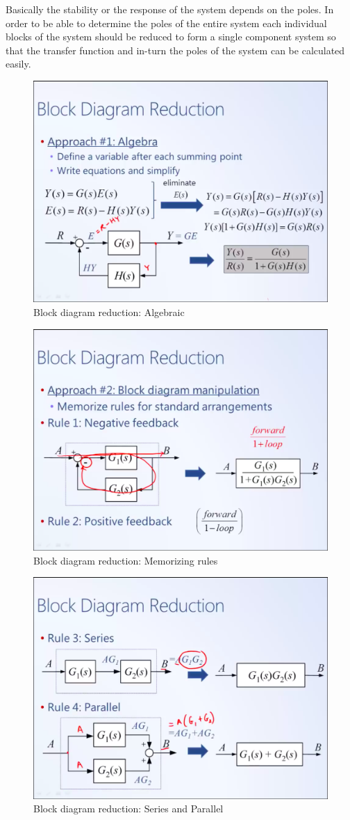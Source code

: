 Basically the stability or the response of the system depends on the poles. In order to be able to determine the poles of the entire system each individual blocks of the system should be reduced to form a single component system so that the transfer function and in-turn the poles of the system can be calculated easily.
\begin{figure}[h!]
	\centering
	\includegraphics[width=0.8\linewidth]{Bilder/BDR_1}
	\caption{Block diagram reduction: Algebraic}
	\label{fig_BDR_1}
\end{figure}
\begin{figure}[h!]
	\centering
	\includegraphics[width=0.8\linewidth]{Bilder/BDR_2}
	\caption{Block diagram reduction: Memorizing rules}
	\label{fig_BDR_2}
\end{figure}
\begin{figure}[h!]
	\centering
	\includegraphics[width=0.8\linewidth]{Bilder/BDR_3}
	\caption{Block diagram reduction: Series and Parallel}
	\label{fig_BDR_3}
\end{figure}
\clearpage

